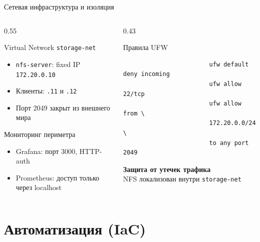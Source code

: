 \documentclass[aspectratio=169,14pt]{beamer}
\begin{document}
	\begin{frame}[fragile]{Сетевая инфраструктура и изоляция}
		\begin{columns}[T]
			\begin{column}{0.55\textwidth}
				\begin{block}{Virtual Network \texttt{storage-net}}
					\begin{itemize}\footnotesize
						\item \texttt{nfs-server}: fixed IP \texttt{172.20.0.10}
						\item Клиенты: \texttt{.11} и \texttt{.12}
						\item Порт 2049 закрыт из внешнего мира
					\end{itemize}
				\end{block}
				\begin{block}{Мониторинг периметра}
					\begin{itemize}\footnotesize
						\item Grafana: порт 3000, HTTP-auth
						\item Prometheus: доступ только через localhost
					\end{itemize}
				\end{block}
			\end{column}
			\begin{column}{0.43\textwidth}
				\begin{alertblock}{Правила UFW}
					\scriptsize
					\begin{verbatim}
						ufw default deny incoming
						ufw allow 22/tcp
						ufw allow from \
						172.20.0.0/24 \
						to any port 2049
					\end{verbatim}
				\end{alertblock}
				\vspace{0.1em}
				\centering\footnotesize\textcolor{accent!70!black}{\textbf{Защита от утечек трафика}}\\
				NFS локализован внутри \texttt{storage-net}
			\end{column}
		\end{columns}
	\end{frame}
	
	\section{Автоматизация (IaC)}
	
\end{document}
